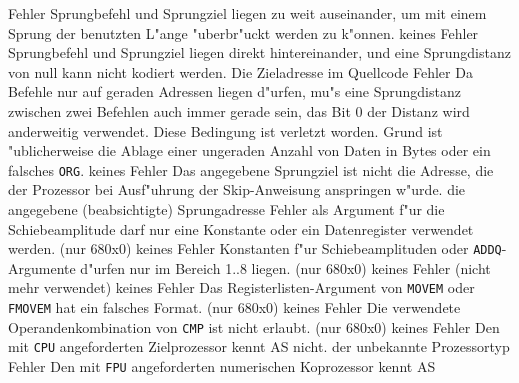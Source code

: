 \documentclass[12pt,a4paper,twoside]{report}
\newcommand{\tty}[1]{{\tt #1}}
\begin{document}
\begin{description}
               {Fehler}
               {Sprungbefehl und Sprungziel liegen zu weit
                auseinander, um mit einem Sprung der benutzten L"ange
                "uberbr"uckt werden zu k"onnen.}
               {keines}
               {Fehler}
               {Sprungbefehl und Sprungziel liegen direkt hintereinander,
                und eine Sprungdistanz von null kann nicht kodiert werden.}
               {Die Zieladresse im Quellcode}
               {Fehler}
               {Da Befehle nur auf geraden Adressen liegen
                d"urfen, mu"s eine Sprungdistanz zwischen zwei Befehlen
                auch immer gerade sein, das Bit 0 der Distanz wird
                anderweitig verwendet.  Diese Bedingung ist verletzt
                worden.  Grund ist "ublicherweise die Ablage einer
                ungeraden Anzahl von Daten in Bytes oder ein falsches \tty{ORG}.}
               {keines}
               {Fehler}
               {Das angegebene Sprungziel ist nicht die Adresse, die der
                Prozessor bei Ausf"uhrung der Skip-Anweisung anspringen w"urde.}
               {die angegebene (beabsichtigte) Sprungadresse}
               {Fehler}
               {als Argument f"ur die Schiebeamplitude darf nur
                eine Konstante oder ein Datenregister verwendet werden.
                (nur 680x0)}
               {keines}
               {Fehler}
               {Konstanten f"ur Schiebeamplituden oder
                \tty{ADDQ}-Argumente d"urfen nur im Bereich 1..8 liegen. (nur
                680x0)}
               {keines}
               {Fehler}
               {(nicht mehr verwendet)}
               {keines}
               {Fehler}
               {Das Registerlisten-Argument von \tty{MOVEM}
	        oder \tty{FMOVEM} hat ein falsches Format. (nur 680x0)}
               {keines}
               {Fehler}
               {Die verwendete Operandenkombination von \tty{CMP}
	        ist nicht erlaubt. (nur 680x0)}
               {keines}
               {Fehler}
               {Den mit \tty{CPU} angeforderten Zielprozessor kennt AS
                nicht.}
               {der unbekannte Prozessortyp}
               {Fehler}
               {Den mit \tty{FPU} angeforderten numerischen Koprozessor kennt AS
}
\end{description}
\end{document}

